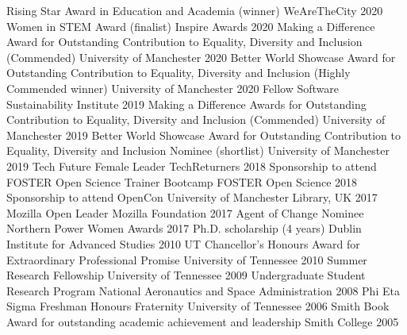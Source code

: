 \begin{cvpress}
 \cvpres
    {Rising Star Award in Education and Academia (winner)}
    {WeAreTheCity}
    {2020}
 \cvpres
    {Women in STEM Award (finalist)}
    {Inspire Awards}
    {2020}
 \cvpres
    {Making a Difference Award for Outstanding Contribution to Equality, Diversity and Inclusion (Commended)}
    {University of Manchester}
    {2020}
 \cvpres
    {Better World Showcase Award for Outstanding Contribution to Equality, Diversity and Inclusion (Highly Commended winner)}
    {University of Manchester}
    {2020}
 \cvpres
    {Fellow}
    {Software Sustainability Institute}
    {2019}
 \cvpres
    {Making a Difference Awards for Outstanding Contribution to Equality, Diversity and Inclusion (Commended)}
    {University of Manchester}
    {2019}
 \cvpres
    {Better World Showcase Award for Outstanding Contribution to Equality, Diversity and Inclusion Nominee (shortlist)}
    {University of Manchester}
    {2019}
 \cvpres
    {Tech Future Female Leader}
    {TechReturners}
    {2018}
 \cvpres
    {Sponsorship to attend FOSTER Open Science Trainer Bootcamp}
    {FOSTER Open Science}
    {2018}
 \cvpres
    {Sponsorship to attend OpenCon}
    {University of Manchester Library, UK}
    {2017}
 \cvpres
    {Mozilla Open Leader}
    {Mozilla Foundation}
    {2017}
  \cvpres
    {Agent of Change Nominee}
    {Northern Power Women Awards}
    {2017}  
    \cvpres
    {Ph.D. scholarship (4 years)}
    {Dublin Institute for Advanced Studies}
    {2010}
  \cvpres
    {UT Chancellor's Honours Award for Extraordinary Professional Promise}
    {University of Tennessee}
    {2010}
  \cvpres
    {Summer Research Fellowship}
    {University of Tennessee}
    {2009}
  \cvpres
    {Undergraduate Student Research Program}
    {National Aeronautics and Space Administration}
    {2008}
  \cvpres
    {Phi Eta Sigma Freshman Honours Fraternity}
    {University of Tennessee}
    {2006}
  \cvpres
    {Smith Book Award for outstanding academic achievement and leadership}
    {Smith College}
    {2005}
\end{cvpress}

